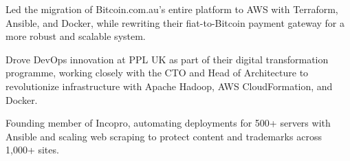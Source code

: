 \documentclass[]{resume}
\begin{document}
\begin{minipage}[t]{0.65\textwidth}
\begin{tightemize}
\item Led the migration of Bitcoin.com.au’s entire platform to AWS with Terraform, Ansible, and Docker, while rewriting their fiat-to-Bitcoin payment gateway for a more robust and scalable system.
\end{tightemize}
\sectionsep

\begin{tightemize}
\item Drove DevOps innovation at PPL UK as part of their digital transformation programme, working closely with the CTO and Head of Architecture to revolutionize infrastructure with Apache Hadoop, AWS CloudFormation, and Docker.
\end{tightemize}
\sectionsep

\begin{tightemize}
\item Founding member of Incopro, automating deployments for 500+ servers with Ansible and scaling web scraping to protect content and trademarks across 1,000+ sites.
\end{tightemize}
\sectionsep


%
%

\end{minipage}
\hfill
\end{document}
